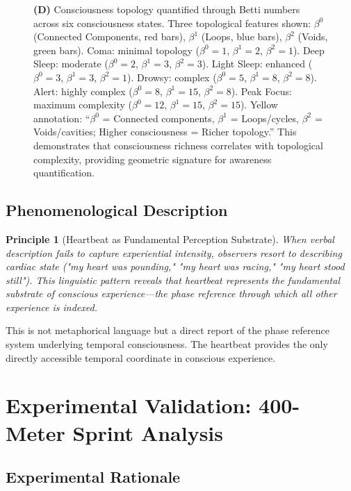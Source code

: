 \documentclass[12pt]{article}
\newtheorem{principle}[theorem]{Principle}
\theoremstyle{remark}
\begin{document}
\begin{figure}[htbp]
{\textbf{(D)} Consciousness topology quantified through Betti numbers across six consciousness states. Three topological features shown: $\beta^0$ (Connected Components, red bars), $\beta^1$ (Loops, blue bars), $\beta^2$ (Voids, green bars). Coma: minimal topology ($\beta^0=1$, $\beta^1=2$, $\beta^2=1$). Deep Sleep: moderate ($\beta^0=2$, $\beta^1=3$, $\beta^2=3$). Light Sleep: enhanced ($\beta^0=3$, $\beta^1=3$, $\beta^2=1$). Drowsy: complex ($\beta^0=5$, $\beta^1=8$, $\beta^2=8$). Alert: highly complex ($\beta^0=8$, $\beta^1=15$, $\beta^2=8$). Peak Focus: maximum complexity ($\beta^0=12$, $\beta^1=15$, $\beta^2=15$). Yellow annotation: ``$\beta^0$ = Connected components, $\beta^1$ = Loops/cycles, $\beta^2$ = Voids/cavities; Higher consciousness = Richer topology.'' This demonstrates that consciousness richness correlates with topological complexity, providing geometric signature for awareness quantification.
}
\label{fig:consciousness_geometry}
\end{figure}


\subsection{Phenomenological Description}

\begin{principle}[Heartbeat as Fundamental Perception Substrate]
When verbal description fails to capture experiential intensity, observers resort to describing cardiac state ("my heart was pounding," "my heart was racing," "my heart stood still"). This linguistic pattern reveals that heartbeat represents the fundamental substrate of conscious experience—the phase reference through which all other experience is indexed.
\end{principle}

This is not metaphorical language but a direct report of the phase reference system underlying temporal consciousness. The heartbeat provides the only directly accessible temporal coordinate in conscious experience.

\section{Experimental Validation: 400-Meter Sprint Analysis}

\subsection{Experimental Rationale}
\end{document}
